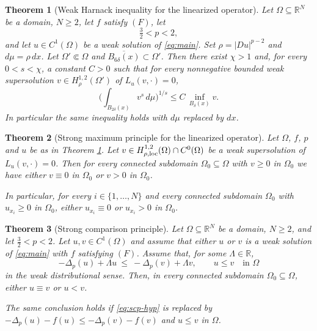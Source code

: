 \documentclass[reqno]{amsart}
\theoremstyle{plain}
\newtheorem{theorem}{Theorem}
\theoremstyle{definition}
\theoremstyle{remark}
\newcommand{\R}{\mathbb{R}}
\newcommand{\Lap}[1]{\Delta_{#1}}
\begin{document}
\begin{theorem}[Weak Harnack inequality for the linearized operator]\label{thm:main1}
Let $\Omega\subseteq\R^N$ be a domain, $N\ge2$, let $f$ satisfy $(F)$, let
\[
\tfrac32<p<2 ,
\]
and let $u\in C^1(\Omega)$ be a weak solution of \eqref{eq:main}. Set $\rho=|Du|^{p-2}$ and
$d\mu=\rho\,dx$. Let $\Omega'\Subset\Omega$ and $\overline{B_{6\delta}(x)}\subset\Omega'$. Then there
exist $\chi>1$ and, for every $0<s<\chi$, a constant $C>0$ such that for every nonnegative bounded
weak supersolution $v\in H^{1,2}_{\rho}(\Omega')$ of $L_u(v,\cdot)=0$,
\begin{equation}\label{eq:weakharnack1}
\Big(\int_{B_{2\delta}(x)}v^{s}\,d\mu\Big)^{1/s}\le C\,\inf_{B_{\delta}(x)}v .
\end{equation}
In particular the same inequality holds with $d\mu$ replaced by $dx$.
\end{theorem}

\begin{theorem}[Strong maximum principle for the linearized operator]\label{thm:main2}
Let $\Omega$, $f$, $p$ and $u$ be as in Theorem \ref{thm:main1}. Let $v\in H^{1,2}_{\rho,\rm loc}(\Omega)\cap C^0(\Omega)$
be a weak supersolution of $L_u(v,\cdot)=0$. Then for every \emph{connected} subdomain
$\Omega_0\subseteq\Omega$ with $v\ge0$ in $\Omega_0$ we have either $v\equiv0$ in $\Omega_0$ or
$v>0$ in $\Omega_0$.

In particular, for every $i\in\{1,\dots,N\}$ and every connected subdomain $\Omega_0$ with
$u_{x_i}\ge0$ in $\Omega_0$, either $u_{x_i}\equiv0$ or $u_{x_i}>0$ in $\Omega_0$.
\end{theorem}

\begin{theorem}[Strong comparison principle]\label{thm:main4}
Let $\Omega\subseteq\R^N$ be a domain, $N\ge2$, and let $\frac32<p<2$.
Let $u,v\in C^1(\Omega)$ and assume that either $u$ or $v$ is a weak solution of \eqref{eq:main}
with $f$ satisfying $(F)$. Assume that, for some $\Lambda\in\R$,
\begin{equation}\label{eq:scp-hyp}
-\Lap{p}(u)+\Lambda u\ \le\ -\Lap{p}(v)+\Lambda v,\qquad u\le v\quad\text{in }\Omega
\end{equation}
in the weak distributional sense. Then, in every connected subdomain $\Omega_0\subseteq\Omega$,
either $u\equiv v$ or $u<v$.

The same conclusion holds if \eqref{eq:scp-hyp} is replaced by
$-\Lap{p}(u)-f(u)\le-\Lap{p}(v)-f(v)$ and $u\le v$ in $\Omega$.
\end{theorem}
\end{document}

